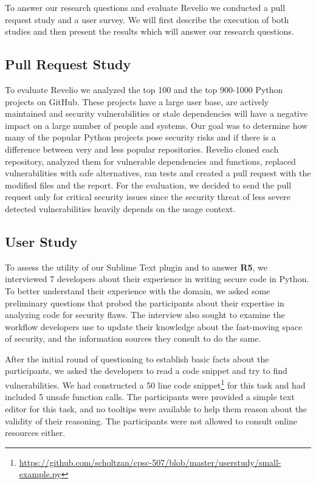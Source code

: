 To answer our research questions and evaluate Revelio we conducted a pull request study and a user survey. We will first describe the execution of both studies and then present the results which will answer our research questions.

\subsection{Pull Request Study}

To evaluate Revelio we analyzed the top 100 and the top 900-1000 Python projects on GitHub. These projects have a large user base, are actively maintained and security vulnerabilities or stale dependencies will have a negative impact on a large number of people and systems. Our goal was to determine how many of the popular Python projects pose security risks and if there is a difference between very and less popular repositories. Revelio cloned each repository, analyzed them for vulnerable dependencies and functions, replaced vulnerabilities with safe alternatives, ran tests and created a pull request with the modified files and the report. For the evaluation, we decided to send the pull request only for critical security issues since the security threat of less severe detected vulnerabilities heavily depends on the usage context.

\subsection{User Study}

To assess the utility of our Sublime Text plugin and to answer \textbf{R5}, we interviewed 7 developers about their experience in writing secure code in Python. To better understand their experience with the domain, we asked some preliminary questions that probed the participants about their expertise in analyzing code for security flaws. The interview also sought to examine the workflow developers use to update their knowledge about the fast-moving space of security, and the information sources they consult to do the same.

After the initial round of questioning to establish basic facts about the participants, we asked the developers to read a code snippet and try to find vulnerabilities. We had constructed a 50 line code snippet\footnote{\url{https://github.com/scholtzan/cpsc-507/blob/master/userstudy/small-example.py}} for this task and had included 5 unsafe function calls. The participants were provided a simple text editor for this task, and no tooltips were available to help them reason about the validity of their reasoning. The participants were not allowed to consult online resources either. 


